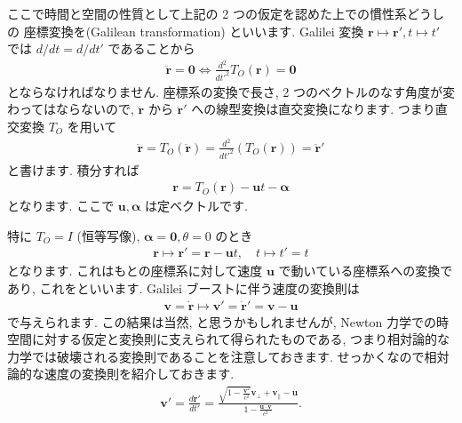 \documentclass[openany, a4paper, oneside]{book}
\theoremstyle{break}
\theoremstyle{breakdefn}
\begin{document}
ここで時間と空間の性質として上記の 2 つの仮定を認めた上での慣性系どうしの
座標変換を(Galilean transformation) といいます.
Galilei 変換 $\bm{r} \mapsto \bm{r}' , t \mapsto t'$ では
$d/dt = d/dt'$ であることから
    \begin{gather}
        \ddot{ \bm{r} }
        =
        \bm{0}
        \Longleftrightarrow
        \frac{d^2} {dt'^2} T_O ( \bm{r} )
        =
        \bm{0}
    \end{gather}
とならなければなりません.
座標系の変換で長さ, 2 つのベクトルのなす角度が変わってはならないので,
 $\ddot{ \bm{r} }$ から $\ddot{ \bm{r} }'$ への線型変換は直交変換になります.
つまり直交変換 $T_O$ を用いて
    \begin{gather}
        \ddot{ \bm{r} }
        =
        T_O \left ( \ddot { \bm{r} } \right)
        =
        \frac{d^2} {dt'^2} \left ( T_O ( \bm{r} )  \right)
        =
        \ddot{ \bm{r} }'
    \end{gather}
と書けます.
積分すれば
    \begin{gather}
        \bm{r}
        =
        T_O \left ( \bm{r} \right) - \bm{u} t - \bm{ \alpha }
    \end{gather}
となります. ここで $\bm{u} , \bm{ \alpha }$ は定ベクトルです.

特に $T_O = I$ (恒等写像), $\bm{\alpha} = \bm{0} , \theta = 0$ のとき
    \begin{gather}
        \bm{r}
        \mapsto
        \bm{r}'
        =
        \bm{r} - \bm{u} t
        , \quad
        t
        \mapsto
        t'
        =
        t
    \end{gather}
となります.
これはもとの座標系に対して速度 $\bm{u}$ で動いている座標系への変換であり,
これをといいます.
Galilei ブーストに伴う速度の変換則は
    \begin{gather}
        \bm{v}
        =
        \dot { \bm{r} }
        \mapsto
        \bm{v}'
        =
        \dot{ \bm{r} }'
        =
        \bm{v} - \bm{u}
    \end{gather}
で与えられます.
この結果は当然, と思うかもしれませんが,
Newton 力学での時空間に対する仮定と変換則に支えられて得られたものである,
つまり相対論的な力学では破壊される変換則であることを注意しておきます.
せっかくなので相対論的な速度の変換則を紹介しておきます.
    \begin{gather}
        \bm{v}'
        =
        \frac{d \bm{r}'} {dt'}
        =
        \frac{ \sqrt{ 1- \frac{ \bm{v}^2 }{ c^2 } } \bm{v}_{\perp} + \bm{v}_{\|} - \bm{u}   }
            { 1 - \frac{ \bm{u} \cdot \bm{v} } { c^2 }  } .
    \end{gather}
\end{document}
